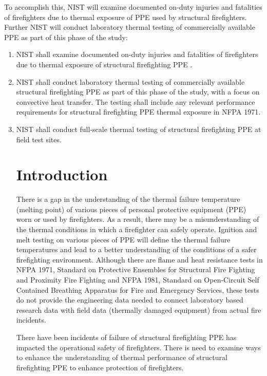 \documentclass[12pt,oneside]{book}
\begin{document}
To accomplish this, NIST will examine documented on-duty injuries and fatalities of firefighters due to thermal exposure of PPE used by structural firefighters.  Further NIST will conduct laboratory thermal testing of commercially available PPE as part of this phase of the study:
\begin{enumerate}
\item NIST shall examine documented on-duty injuries and fatalities of firefighters due to thermal exposure of structural firefighting PPE \cite{Weinschenk:Chicago,Overholt:San_Francisco,Weinschenk:PGCounty}.
\item NIST shall conduct laboratory thermal testing of commercially available structural firefighting PPE as part of this phase of the study, with a focus on convective heat transfer.  The testing shall include any relevant performance requirements for structural firefighting PPE thermal exposure in NFPA 1971.
\item NIST shall conduct full-scale thermal testing of structural firefighting PPE at field test sites.

\chapter{Introduction}
\setcounter{page}{1}
There is a gap in the understanding of the thermal failure temperature (melting point) of various pieces of personal protective equipment (PPE) worn or used by firefighters.  As a result, there may be a misunderstanding of the thermal conditions in which a firefighter can safely operate.  Ignition and melt testing on various pieces of PPE will define the thermal failure temperatures and lead to a better understanding of the conditions of a safer firefighting environment.  Although there are flame and heat resistance tests in NFPA 1971, Standard on Protective Ensembles for Structural Fire Fighting and Proximity Fire Fighting and NFPA 1981, Standard on Open-Circuit Self Contained Breathing Apparatus for Fire and Emergency Services, these tests do not provide the engineering data needed to connect laboratory based research data with field data (thermally damaged equipment) from actual fire incidents.

There have been incidents of failure of structural firefighting PPE has impacted the operational safety of firefighters.  There is need to examine ways to enhance the understanding of thermal performance of structural firefighting PPE to enhance protection of firefighters.


\end{enumerate}
\end{document}

